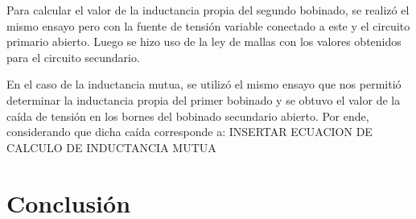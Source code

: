 \documentclass[a4paper,12pt]{article}
\begin{document}
\hspace{1cm} Para calcular el valor de la inductancia propia del segundo bobinado, se realizó el mismo ensayo pero con la fuente
de tensión variable conectado a este y el circuito primario abierto. Luego se hizo uso de la ley de mallas con los valores
obtenidos para el circuito secundario.

\hspace{1cm} En el caso de la inductancia mutua, se utilizó el mismo ensayo que nos permitió determinar la inductancia propia del primer
bobinado y se obtuvo el valor de la caída de tensión en los bornes del bobinado secundario abierto. Por ende, considerando que dicha 
caída corresponde a: INSERTAR ECUACION DE CALCULO DE INDUCTANCIA MUTUA

\section{Conclusión}
\end{document}
